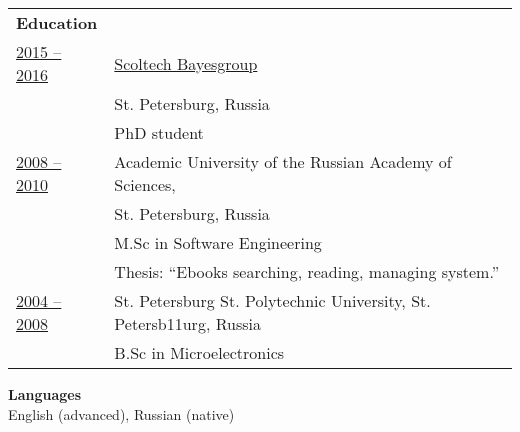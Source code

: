 \documentclass[letterpaper,11pt,oneside]{article}
\begin{document}
\noindent \begin{tabular}{@{} l l}

\noindent \textbf{Education}  & \vspace{1em} \\

\underline{2015 -- 2016}     &  \hspace{10mm}\href{https://cs.hse.ru/en/bayesgroup/}{Scoltech Bayesgroup}   \\
                             &  \hspace{10mm}St. Petersburg, Russia  \\
                             &  \hspace{10mm}PhD student \vspace{1em} \\

\underline{2008 -- 2010}     &  \hspace{10mm}Academic University of the Russian Academy of Sciences,  \\
                             &  \hspace{10mm}St. Petersburg, Russia  \\
                             &  \hspace{10mm}M.Sc in Software Engineering  \\                             
                             &  \hspace{10mm}Thesis: “Ebooks searching, reading, managing system.”  \vspace{1em} \\                             

\underline{2004 -- 2008}     &  \hspace{10mm}St. Petersburg St. Polytechnic University, St. Petersb11urg, Russia   \\
                             &  \hspace{10mm}B.Sc in Microelectronics \vspace{1em} \\

\end{tabular}

\noindent \textbf{Languages} \vspace{1em} \\
\noindent English (advanced), Russian (native)
\end{document}
